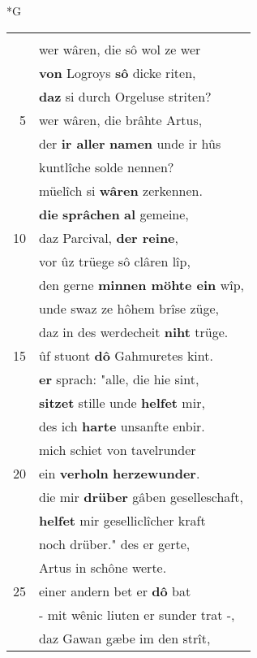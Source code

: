 \documentclass[8pt,a4paper,notitlepage]{article}
\begin{document}
\begin{table}[ht]
\begin{minipage}[t]{0.5\linewidth}
\small
\begin{center}*G
\end{center}
\begin{tabular}{rl}
 & \textit{\begin{large}W\end{large}}er was Clinsores her?\\ 
 & wer wâren, die sô wol ze wer\\ 
 & \textbf{von} Logroys \textbf{sô} dicke riten,\\ 
 & \textbf{daz} si durch Orgeluse striten?\\ 
5 & wer wâren, die brâhte Artus,\\ 
 & der \textbf{ir aller} \textbf{namen} unde ir hûs\\ 
 & kuntlîche solde nennen?\\ 
 & müelîch si \textbf{wâren} zerkennen.\\ 
 & \textbf{die} \textbf{sprâchen} \textbf{al} gemeine,\\ 
10 & daz Parcival, \textbf{der reine},\\ 
 & vor ûz trüege sô clâren lîp,\\ 
 & den gerne \textbf{minnen möhte ein} wîp,\\ 
 & unde swaz ze hôhem brîse züge,\\ 
 & daz in des werdecheit \textbf{niht} trüge.\\ 
15 & ûf stuont \textbf{dô} Gahmuretes kint.\\ 
 & \textbf{er} sprach: "alle, die hie sint,\\ 
 & \textbf{sitzet} stille unde \textbf{helfet} mir,\\ 
 & des ich \textbf{harte} unsanfte enbir.\\ 
 & mich schiet von tavelrunder\\ 
20 & ein \textbf{verholn} \textbf{herzewunder}.\\ 
 & die mir \textbf{drüber} gâben geselleschaft,\\ 
 & \textbf{helfet} mir geselliclîcher kraft\\ 
 & noch drüber." des er gerte,\\ 
 & Artus in schône werte.\\ 
25 & einer andern bet er \textbf{dô} bat\\ 
 & - mit wênic liuten er sunder trat -,\\ 
 & daz Gawan gæbe im den strît,\\ 

\end{tabular}
\end{minipage}
\end{table}
\end{document}
